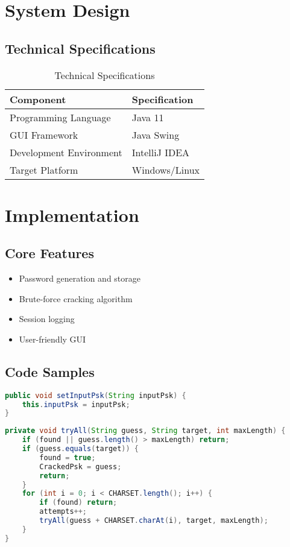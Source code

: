 \documentclass[12pt,a4paper]{report}
\begin{document}
\chapter{System Design}
\section{Technical Specifications}
\begin{table}[H]
    \centering
    \begin{tabular}{|l|l|}
    \hline
    \textbf{Component} & \textbf{Specification} \\ \hline
    Programming Language & Java 11 \\ \hline
    GUI Framework & Java Swing \\ \hline
    Development Environment & IntelliJ IDEA \\ \hline
    Target Platform & Windows/Linux \\ \hline
    \end{tabular}
    \caption{Technical Specifications}
\end{table}

\chapter{Implementation}
\section{Core Features}
\begin{itemize}
    \item Password generation and storage
    \item Brute-force cracking algorithm
    \item Session logging
    \item User-friendly GUI
\end{itemize}

\section{Code Samples}
\begin{lstlisting}[language=Java,caption=Password Generation]
public void setInputPsk(String inputPsk) {
    this.inputPsk = inputPsk;
}
\end{lstlisting}

\begin{lstlisting}[language=Java,caption=Cracking Algorithm]
private void tryAll(String guess, String target, int maxLength) {
    if (found || guess.length() > maxLength) return;
    if (guess.equals(target)) {
        found = true;
        CrackedPsk = guess;
        return;
    }
    for (int i = 0; i < CHARSET.length(); i++) {
        if (found) return;
        attempts++;
        tryAll(guess + CHARSET.charAt(i), target, maxLength);
    }
}
\end{lstlisting}
\end{document}
